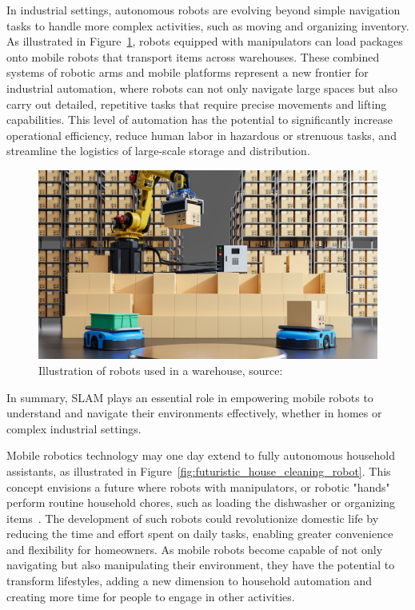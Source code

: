 In industrial settings, autonomous robots are evolving beyond simple navigation tasks to handle more complex activities, such as moving and organizing inventory. As illustrated in Figure~\ref{fig:robots_in_warehouse}, robots equipped with manipulators can load packages onto mobile robots that transport items across warehouses. These combined systems of robotic arms and mobile platforms represent a new frontier for industrial automation, where robots can not only navigate large spaces but also carry out detailed, repetitive tasks that require precise movements and lifting capabilities. This level of automation has the potential to significantly increase operational efficiency, reduce human labor in hazardous or strenuous tasks, and streamline the logistics of large-scale storage and distribution.

\FloatBarrier
\begin{figure}[htbp]
	\centering
	\includegraphics[width=150mm, keepaspectratio]{figures_jpg/warehouse_robots.jpg}
	\caption{Illustration of robots used in a warehouse, source:~\cite{robots_in_warehouse}}
	\label{fig:robots_in_warehouse}
\end{figure}
\FloatBarrier

In summary, SLAM plays an essential role in empowering mobile robots to understand and navigate their environments effectively, whether in homes or complex industrial settings.

Mobile robotics technology may one day extend to fully autonomous household assistants, as illustrated in Figure~\ref{fig:futuristic_house_cleaning_robot}. This concept envisions a future where robots with manipulators, or robotic "hands" perform routine household chores, such as loading the dishwasher or organizing items~\cite{physical_intelligence}. The development of such robots could revolutionize domestic life by reducing the time and effort spent on daily tasks, enabling greater convenience and flexibility for homeowners. As mobile robots become capable of not only navigating but also manipulating their environment, they have the potential to transform lifestyles, adding a new dimension to household automation and creating more time for people to engage in other activities.

